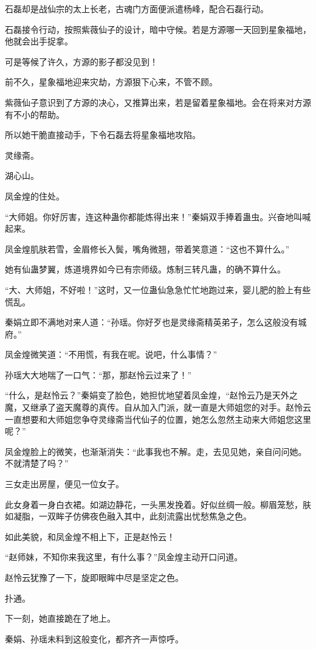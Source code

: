 \begin{this_body}
石磊却是战仙宗的太上长老，古魂门方面便派遣杨峰，配合石磊行动。

石磊接令行动，按照紫薇仙子的设计，暗中守候。若是方源哪一天回到星象福地，他就会出手捉拿。

可是等候了许久，方源的影子都没见到！

前不久，星象福地迎来灾劫，方源狠下心来，不管不顾。

紫薇仙子意识到了方源的决心，又推算出来，若是留着星象福地。会在将来对方源有不小的帮助。

所以她干脆直接动手，下令石磊去将星象福地攻陷。

灵缘斋。

湖心山。

凤金煌的住处。

“大师姐。你好厉害，连这种蛊你都能炼得出来！”秦娟双手捧着蛊虫。兴奋地叫喊起来。

凤金煌肌肤若雪，金眉修长入鬓，嘴角微翘，带着笑意道：“这也不算什么。”

她有仙蛊梦翼，炼道境界如今已有宗师级。炼制三转凡蛊，的确不算什么。

“大、大师姐，不好啦！”这时，又一位蛊仙急急忙忙地跑过来，婴儿肥的脸上有些慌乱。

秦娟立即不满地对来人道：“孙瑶。你好歹也是灵缘斋精英弟子，怎么这般没有城府。”

凤金煌微笑道：“不用慌，有我在呢。说吧，什么事情？”

孙瑶大大地喘了一口气：“那，那赵怜云过来了！”

“什么，是赵怜云？”秦娟变了脸色，她担忧地望着凤金煌，“赵怜云乃是天外之魔，又继承了盗天魔尊的真传。自从加入门派，就一直是大师姐您的对手。赵怜云一直想要和大师姐您争夺灵缘斋当代仙子的位置，她怎么忽然主动来大师姐您这里呢？”

凤金煌脸上的微笑，也渐渐消失：“此事我也不解。走，去见见她，亲自问问她。不就清楚了吗？”

三女走出房屋，便见一位女子。

此女身着一身白衣裙。如湖边静花，一头黑发挽着。好似丝绸一般。柳眉笼愁，肤如凝脂，一双眸子仿佛夜色融入其中，此刻流露出忧愁焦急之色。

如此美貌，和凤金煌不相上下，正是赵怜云！

“赵师妹，不知你来我这里，有什么事？”凤金煌主动开口问道。

赵怜云犹豫了一下，旋即眼眸中尽是坚定之色。

扑通。

下一刻，她直接跪在了地上。

秦娟、孙瑶未料到这般变化，都齐齐一声惊呼。


\end{this_body}
